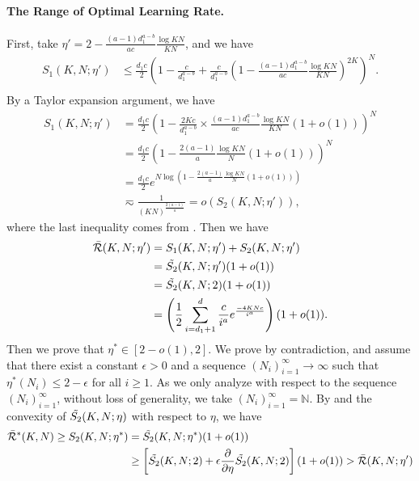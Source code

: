 \paragraph{The Range of Optimal Learning Rate.}
First, take $\eta' = 2-\frac{(a-1)d_1^{a-b}}{ac}\frac{\log KN}{KN}$, and we have
    \begin{align*}
        S_1(K, N; \eta') &\leq \frac{d_1c}{2}\left(1-\frac{c}{d_1^{a-b}}+\frac{c}{d_1^{a-b}}\left(1-\frac{(a-1)d_1^{a-b}}{ac}\frac{\log KN}{KN}\right)^{2K}\right)^N. \\
    \end{align*}
By a Taylor expansion argument, we have
    \begin{align*}
        S_1(K, N; \eta')&=\frac{d_1c}{2}\left(1-\frac{2Kc}{d_1^{a-b}}\times\frac{(a-1)d_1^{a-b}}{ac}\frac{\log KN}{KN}(1+o(1))\right)^N \\
        &=\frac{d_1c}{2}\left(1-\frac{2(a-1)}{a}\frac{\log KN}{N}(1+o(1))\right)^N \\
        &=\frac{d_1c}{2}e^{N\log\left(1-\frac{2(a-1)}{a}\frac{\log KN}{N}(1+o(1))\right)} \\
        &\eqsim \frac{1}{(KN)^{\frac{2(a-1)}{a}}} =o(S_2(K, N;\eta')),
    \end{align*}
    where the last inequality comes from . Then we have
    \begin{align*}
        \Bar{\mathcal{R}}(K, N;\eta')&=S_1(K, N;\eta')+S_2(K, N;\eta') \\
        &=\Tilde{S_2}(K, N;\eta')(1+o(1)) \\
        &=\Tilde{S_2}(K, N;2)(1+o(1)) \\
        &=\left(\frac{1}{2}\sum_{i=d_1+1}^{d}\frac{c}{i^{a}}e^{\frac{-4KNc}{i^{a}}}\right)(1+o(1)).
    \end{align*}
    Then we prove that $\eta^* \in [2-o(1), 2]$.
    We prove by contradiction, and assume that there exist a constant $\epsilon>0$ and a sequence $(N_i)_{i=1}^{\infty}\to \infty$ such that $\eta^*(N_i)\leq 2-\epsilon$ for all $i\geq 1$. As we only analyze with respect to the sequence $(N_i)_{i=1}^{\infty}$, without loss of generality, we take $(N_i)_{i=1}^{\infty}=\mathds{N}$. By  and the convexity of $\Tilde{S_2}(K, N;\eta)$ with respect to $\eta$, we have 
    \begin{align*}
        \Bar{\mathcal{R}}^*(K, N)\geq S_2(K, N;\eta^*)&=\Tilde{S_2}(K, N; \eta^*)(1+o(1)) \\
        &\geq\left[\Tilde{S_2}(K, N;2)+\epsilon\frac{\partial}{\partial \eta}\Tilde{S_2}(K, N; 2)\right](1+o(1))>\Bar{\mathcal{R}}(K, N;\eta')
    \end{align*}
